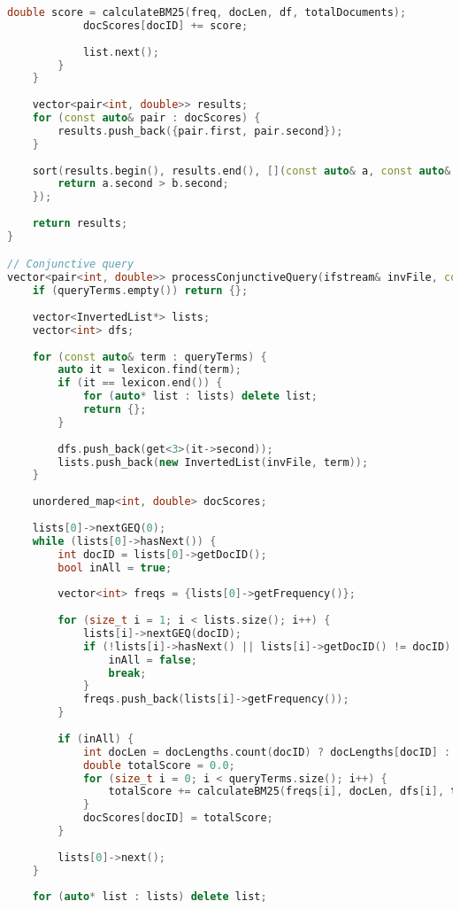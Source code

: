 \documentclass[11pt, a4paper]{report}
\begin{document}
\begin{lstlisting}[language=C++, caption={The complete source code for the query processor.}, label={lst:query}]
            double score = calculateBM25(freq, docLen, df, totalDocuments);
            docScores[docID] += score;
            
            list.next();
        }
    }
    
    vector<pair<int, double>> results;
    for (const auto& pair : docScores) {
        results.push_back({pair.first, pair.second});
    }
    
    sort(results.begin(), results.end(), [](const auto& a, const auto& b) {
        return a.second > b.second;
    });
    
    return results;
}

// Conjunctive query
vector<pair<int, double>> processConjunctiveQuery(ifstream& invFile, const vector<string>& queryTerms) {
    if (queryTerms.empty()) return {};
    
    vector<InvertedList*> lists;
    vector<int> dfs;
    
    for (const auto& term : queryTerms) {
        auto it = lexicon.find(term);
        if (it == lexicon.end()) {
            for (auto* list : lists) delete list;
            return {};
        }
        
        dfs.push_back(get<3>(it->second));
        lists.push_back(new InvertedList(invFile, term));
    }
    
    unordered_map<int, double> docScores;
    
    lists[0]->nextGEQ(0);
    while (lists[0]->hasNext()) {
        int docID = lists[0]->getDocID();
        bool inAll = true;
        
        vector<int> freqs = {lists[0]->getFrequency()};
        
        for (size_t i = 1; i < lists.size(); i++) {
            lists[i]->nextGEQ(docID);
            if (!lists[i]->hasNext() || lists[i]->getDocID() != docID) {
                inAll = false;
                break;
            }
            freqs.push_back(lists[i]->getFrequency());
        }
        
        if (inAll) {
            int docLen = docLengths.count(docID) ? docLengths[docID] : (int)avgDocLength;
            double totalScore = 0.0;
            for (size_t i = 0; i < queryTerms.size(); i++) {
                totalScore += calculateBM25(freqs[i], docLen, dfs[i], totalDocuments);
            }
            docScores[docID] = totalScore;
        }
        
        lists[0]->next();
    }
    
    for (auto* list : lists) delete list;
    

\end{lstlisting}
\end{document}
